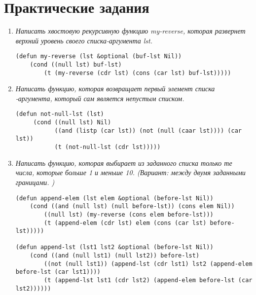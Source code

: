 \chapter{Практические задания}
\begin{enumerate}[wide=0pt]
	\item \textit{Написать хвостовую рекурсивную функцию my-reverse, которая развернет верхний уровень своего списка-аргумента lst.}
	\begin{lstlisting}
(defun my-reverse (lst &optional (buf-lst Nil))
	(cond ((null lst) buf-lst)
		(t (my-reverse (cdr lst) (cons (car lst) buf-lst)))))
	\end{lstlisting}
	\item \textit{Написать функцию, которая возвращает первый элемент списка -аргумента, который сам является непустым списком.}
	\begin{lstlisting}
(defun not-null-lst (lst)
     (cond ((null lst) Nil)
           ((and (listp (car lst)) (not (null (caar lst)))) (car lst))
           (t (not-null-lst (cdr lst)))))
	\end{lstlisting}
	\item \textit{Написать функцию, которая выбирает из заданного списка только те числа, которые больше 1 и меньше 10. (Вариант: между двумя заданными границами. )}
	\begin{lstlisting}	
(defun append-elem (lst elem &optional (before-lst Nil))
	(cond ((and (null lst) (null before-lst)) (cons elem Nil))
		((null lst) (my-reverse (cons elem before-lst)))
		(t (append-elem (cdr lst) elem (cons (car lst) before-lst)))))

(defun append-lst (lst1 lst2 &optional (before-lst Nil))
	(cond ((and (null lst1) (null lst2)) before-lst)
		((not (null lst1)) (append-lst (cdr lst1) lst2 (append-elem before-lst (car lst1))))
		(t (append-lst lst1 (cdr lst2) (append-elem before-lst (car lst2))))))


\end{lstlisting}
\end{enumerate}
